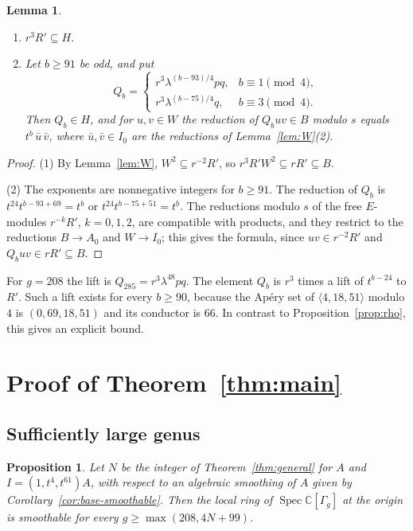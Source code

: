 \documentclass{amsart}
\newtheorem{proposition}[theorem]{Proposition}
\newtheorem{lemma}[theorem]{Lemma}
\theoremstyle{definition}
\theoremstyle{remark}
\numberwithin{equation}{section}
\newcommand{\C}{\mathbb{C}}
\DeclareMathOperator{\Spec}{Spec}
\begin{document}
\begin{lemma}\label{lem:lift}
\begin{enumerate}
\item $r^3R'\subseteq H$.
\item Let $b\ge91$ be odd, and put
\[
Q_b=\begin{cases} r^3\lambda^{(b-93)/4}pq,& b\equiv1\pmod4,\\ r^3\lambda^{(b-75)/4}q,& b\equiv3\pmod4.\end{cases}
\]
Then $Q_b\in H$, and for $u,v\in W$ the reduction of $Q_buv\in B$ modulo $s$ equals $t^b\,\bar u\,\bar v$, where $\bar u,\bar v\in I_0$ are the reductions of Lemma~\ref{lem:W}(2).
\end{enumerate}
\end{lemma}

\begin{proof}
(1) By Lemma~\ref{lem:W}, $W^2\subseteq r^{-2}R'$, so $r^3R'W^2\subseteq rR'\subseteq B$.

(2) The exponents are nonnegative integers for $b\ge91$. The reduction of $Q_b$ is $t^{24}t^{b-93+69}=t^b$ or $t^{24}t^{b-75+51}=t^b$. The reductions modulo $s$ of the free $E$-modules $r^{-k}R'$, $k=0,1,2$, are compatible with products, and they restrict to the reductions $B\to A_0$ and $W\to I_0$; this gives the formula, since $uv\in r^{-2}R'$ and $Q_buv\in rR'\subseteq B$.
\end{proof}

For $g=208$ the lift is $Q_{285}=r^3\lambda^{48}pq$. The element $Q_b$ is $r^3$ times a lift of $t^{b-24}$ to $R'$. Such a lift exists for every $b\ge90$, because the Ap\'ery set of $\langle4,18,51\rangle$ modulo $4$ is $(0,69,18,51)$ and its conductor is $66$. In contrast to Proposition~\ref{prop:rho}, this gives an explicit bound.

\section{Proof of Theorem~\ref{thm:main}}\label{sec:proof}

\subsection{Sufficiently large genus}

\begin{proposition}\label{prop:large}
Let $N$ be the integer of Theorem~\ref{thm:general} for $A$ and $I=(1,t^4,t^{61})A$, with respect to an algebraic smoothing of $A$ given by Corollary~\ref{cor:base-smoothable}. Then the local ring of $\Spec\C[\Gamma_g]$ at the origin is smoothable for every $g\ge\max(208,4N+99)$.
\end{proposition}
\end{document}
